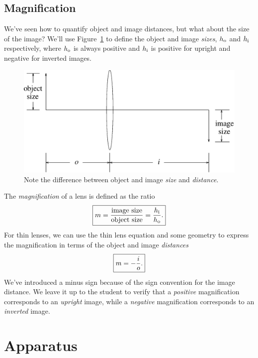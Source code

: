 \subsection{Magnification}

We've seen how to quantify object and image distances, but what about the size
of the image?  We'll use Figure~\ref{fig:opt:sizes} to define the object and
image {\it sizes}, $h_{\rm o}$ and $h_{\rm i}$ respectively, where $h_{\rm o}$
is always positive and $h_{\rm i}$ is positive for upright and negative for
inverted images.
\begin{figure}[htb]
\centering 
\epsfxsize=13cm \includegraphics[scale=0.6]{9_imaging/sizes.eps}
\caption{Note the difference between object and image {\it size} and 
{\it distance}.}
\label{fig:opt:sizes}
\end{figure}
The {\it magnification} of a lens is defined as the ratio
\begin{equation}
\fbox{$ \displaystyle m=\frac{\mbox{image size}}{\mbox{object size}}=
\frac{h_{\rm i}}{h_{\rm o}}. $} \label{eq:opt:magdef}
\end{equation}
For thin lenses, we can use the thin lens equation and some geometry to express
the magnification in terms of the object and image {\it distances}
\begin{equation}
\fbox{$ \displaystyle m= -\frac{i}{o}. $} \label{eq:opt:thinlensmag}
\end{equation}
We've introduced a minus sign because of the sign convention for the image 
distance. We leave it up to the student to verify that a {\it positive} 
magnification corresponds to an {\it upright} image, while a {\it negative}
magnification corresponds to an {\it inverted} image.

\section{Apparatus}

